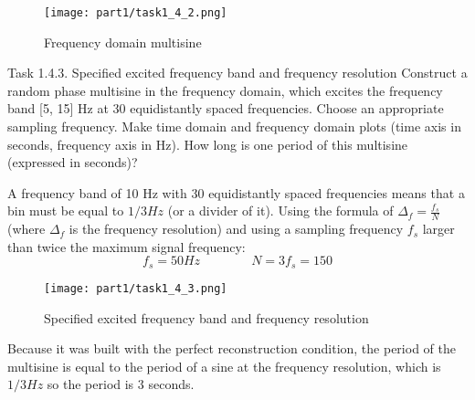 \begin{figure}[H]
    \centering
    \texttt{[image: part1/task1\_4\_2.png]}
    \caption{Frequency domain multisine}
\end{figure}

\begin{Task}{Task 1.4.3. Specified excited frequency band and frequency resolution}
    Construct a random phase multisine in the frequency domain, which excites the frequency band [5, 15] Hz at 30 equidistantly spaced frequencies. Choose an appropriate sampling frequency. Make time domain and frequency domain plots (time axis in seconds, frequency axis in Hz). How long is one period of this multisine (expressed in seconds)?
\end{Task}

A frequency band of 10 Hz with 30 equidistantly spaced frequencies means that a bin must be equal to $1/3 Hz$ (or a divider of it). Using the formula of $\Delta_f = \frac{f_s}{N}$ (where $\Delta_f$ is the frequency resolution) and using a sampling frequency $f_s$ larger than twice the maximum signal frequency:
\begin{equation*}
    f_s = 50 Hz \quad\quad\quad\quad N = 3 f_s = 150
\end{equation*}

\begin{figure}[H]
    \centering
    \texttt{[image: part1/task1\_4\_3.png]}
    \caption{Specified excited frequency band and frequency resolution}
\end{figure}

Because it was built with the perfect reconstruction condition, the period of the multisine is equal to the period of a sine at the frequency resolution, which is $1/3 Hz$ so the period is $3$ seconds.

